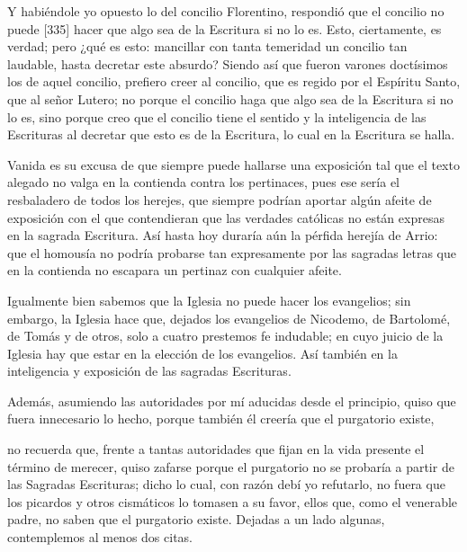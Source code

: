 Y habiéndole yo opuesto lo del concilio Florentino, respondió que el concilio no puede [335] hacer que algo sea de la Escritura si no lo es. Esto, ciertamente, es verdad; pero ¿qué es esto: mancillar con tanta temeridad un concilio tan laudable, hasta decretar este absurdo? Siendo así que fueron varones doctísimos los de aquel concilio, prefiero creer al concilio, que es regido por el Espíritu Santo, que al señor Lutero; no porque el concilio haga que algo sea de la Escritura si no lo es, sino porque creo que el concilio tiene el sentido y la inteligencia de las Escrituras al decretar que esto es de la Escritura, lo cual en la Escritura se halla.

Vanida es su excusa de que siempre puede hallarse una exposición tal que el texto alegado no valga en la contienda contra los pertinaces, pues ese sería el resbaladero de todos los herejes, que siempre podrían aportar algún afeite de exposición con el que contendieran que las verdades católicas no están expresas en la sagrada Escritura. Así hasta hoy duraría aún la pérfida herejía de Arrio: que el homousía no podría probarse tan expresamente por las sagradas letras que en la contienda no escapara un pertinaz con cualquier afeite.

Igualmente bien sabemos que la Iglesia no puede hacer los evangelios; sin embargo, la Iglesia hace que, dejados los evangelios de Nicodemo, de Bartolomé, de Tomás y de otros, solo a cuatro prestemos fe indudable; en cuyo juicio de la Iglesia hay que estar en la elección de los evangelios. Así también en la inteligencia y exposición de las sagradas Escrituras.

Además, asumiendo las autoridades por mí aducidas desde el principio, quiso que fuera innecesario lo hecho, porque también él creería que el purgatorio existe,

no recuerda que, frente a tantas autoridades que fijan en la vida presente el término de merecer, quiso zafarse porque el purgatorio no se probaría a partir de las Sagradas Escrituras; dicho lo cual, con razón debí yo refutarlo, no fuera que los picardos y otros cismáticos lo tomasen a su favor, ellos que, como el venerable padre, no saben que el purgatorio existe. Dejadas a un lado algunas, contemplemos al menos dos citas.

